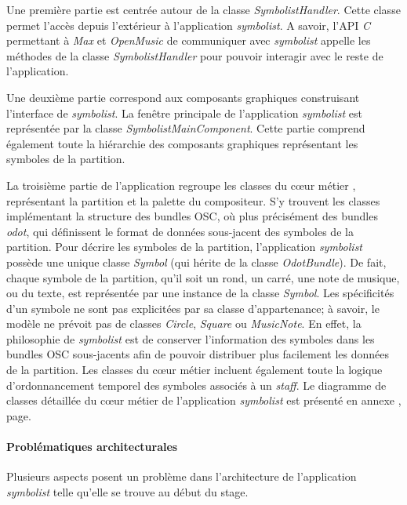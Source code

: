 Une première partie est centrée autour de la classe \textit{SymbolistHandler}. Cette classe permet l'accès depuis l'extérieur à l'application \textit{symbolist}. A savoir, l'API \textit{C} permettant à \textit{Max} et \textit{OpenMusic} de communiquer avec \textit{symbolist} appelle les méthodes de la classe \textit{SymbolistHandler} pour pouvoir interagir avec le reste de l'application.

Une deuxième partie correspond aux composants graphiques construisant l'interface de \textit{symbolist}. La fenêtre principale de l'application \textit{symbolist} est représentée par la classe \textit{SymbolistMainComponent}. Cette partie comprend également toute la hiérarchie des composants graphiques représentant les symboles de la partition.

La troisième partie de l'application regroupe les classes du \og cœur métier \fg, représentant la partition et la palette du compositeur. 
S'y trouvent les classes implémentant la structure des bundles OSC, où plus précisément des bundles \textit{odot}, qui définissent le format de données sous-jacent des symboles de la partition.
Pour décrire les symboles de la partition, l'application \textit{symbolist} possède une unique classe \textit{Symbol} (qui hérite de la classe \textit{OdotBundle}). De fait, chaque symbole de la partition, qu'il soit un rond, un carré, une note de musique, ou du texte, est représentée par une instance de la classe \textit{Symbol}. Les spécificités d'un symbole ne sont pas explicitées par sa classe d'appartenance; 
à savoir, le modèle ne prévoit pas de classes \textit{Circle}, \textit{Square} ou \textit{MusicNote}.
En effet, la philosophie de \textit{symbolist} est de conserver l'information des symboles dans les bundles OSC sous-jacents afin de pouvoir distribuer plus facilement les données de la partition.
Les classes du cœur métier incluent également toute la logique d'ordonnancement temporel des symboles associés à un \textit{staff}.
Le diagramme de classes détaillée du cœur métier de l'application \textit{symbolist} est présenté en annexe , page.

\paragraph{Problématiques architecturales} Plusieurs aspects posent un problème dans l'architecture de l'application \textit{symbolist} telle qu'elle se trouve au début du stage.

